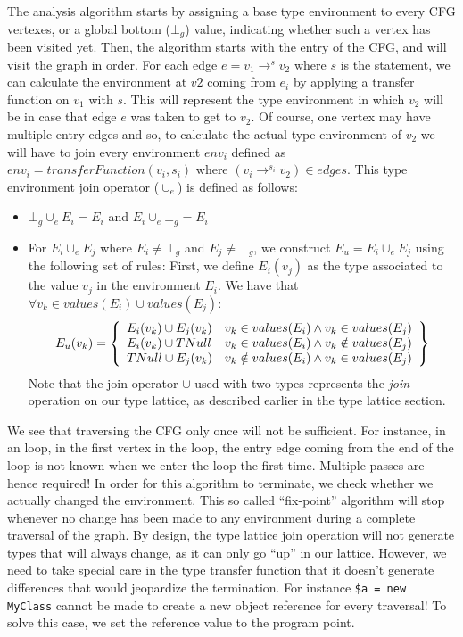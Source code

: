 \documentclass[a4paper]{article}
\begin{document}
The analysis algorithm starts by assigning a base type environment to every CFG
vertexes, or a global bottom ($\bot_g$) value, indicating whether such a vertex
has been visited yet. Then, the algorithm starts with the entry of the CFG, and
will visit the graph in order. For each edge $e = v_1 \rightarrow^s v_2$ where
$s$ is the statement, we can calculate the environment at $v2$ coming from
$e_i$ by applying a transfer function on $v_1$ with $s$. This will represent
the type environment in which $v_2$ will be in case that edge $e$ was taken to
get to $v_2$. Of course, one vertex may have multiple entry edges and so, to
calculate the actual type environment of $v_2$ we will have to join every
environment $env_i$ defined as $env_i = transferFunction(v_i, s_i)$ where $(v_i
\rightarrow^{s_i} v_2) \in edges$. This type environment join operator
($\cup_e$) is defined as follows:
\begin{itemize}
  \item $\bot_g \cup_e E_i = E_i$ and $E_i \cup_e \bot_g = E_i$
  \item For $E_i \cup_e E_j$ where $E_i \neq \bot_g$ and $E_j \neq \bot_g$, we
    construct $E_u = E_i \cup_e E_j$ using the following set of rules: First,
    we define $E_i(v_j)$ as the type associated to the value $v_j$ in the
    environment $E_i$.  We have that $ \forall v_k \in values(E_i) \cup
    values(E_j):$
    \begin{eqnarray*}
      E_u(v_k) = \left \{ \begin{array}{l l}
        E_i(v_k) \cup E_j(v_k) & v_k \in values(E_i)    \wedge v_k \in values(E_j) \\
        E_i(v_k) \cup TNull    & v_k \in values(E_i)    \wedge v_k \notin values(E_j) \\
        TNull    \cup E_j(v_k) & v_k \notin values(E_i) \wedge v_k \in values(E_j)
      \end{array} \right \}
    \end{eqnarray*}
    Note that the join operator $\cup$ used with two types represents the
    \emph{join} operation on our type lattice, as described earlier in the 
    type lattice section.
\end{itemize}

We see that traversing the CFG only once will not be sufficient. For instance, in
an loop, in the first vertex in the loop, the entry edge coming from the end
of the loop is not known when we enter the loop the first time. Multiple passes
are hence required! In order for this algorithm to terminate, we check whether
we actually changed the environment. This so called ``fix-point'' algorithm will
stop whenever no change has been made to any environment during a complete
traversal of the graph. By design, the type lattice join operation will not
generate types that will always change, as it can only go ``up'' in our
lattice. However, we need to take special care in the type transfer function that
it doesn't generate differences that would jeopardize the termination. For instance
\verb/$a = new MyClass/ cannot be made to create a new object reference for
every traversal! To solve this case, we set the reference value to the program point.
\end{document}
